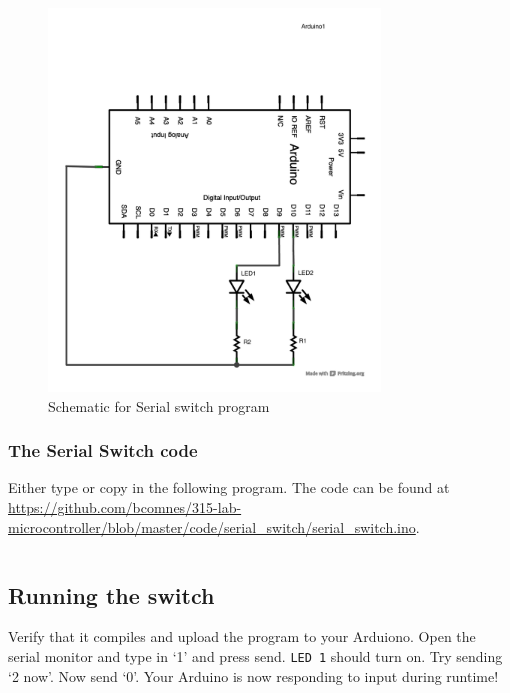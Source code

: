 \documentclass[11pt,a4paper]{article}
\begin{document}
\begin{figure}[htbp]
    \centering
        \includegraphics[height=4in]{figures/serial_switch_schem.pdf}
    \caption{Schematic for Serial switch program}
    \label{fig:figures_serial_switch_schem}
\end{figure}

\subsubsection{The Serial Switch code} %
\label{ssub:the_serial_switch_code}

Either type or copy in the following program.  The code can be found at \url{https://github.com/bcomnes/315-lab-microcontroller/blob/master/code/serial_switch/serial_switch.ino}.

\inputminted[mathescape,linenos,numbersep=5pt,gobble=0,frame=lines,framesep=2mm]{c}{code/serial_switch/serial_switch.ino}


\subsection{Running the switch} %
\label{sub:running_the_switch}

Verify that it compiles and upload the program to your Arduiono.  Open the serial monitor and type in `1' and press send.  \texttt{LED 1} should turn on.  Try sending `2 now'.  Now send `0'.  Your Arduino is now responding to input during runtime!


 
 \nocite{*}
\end{document}
